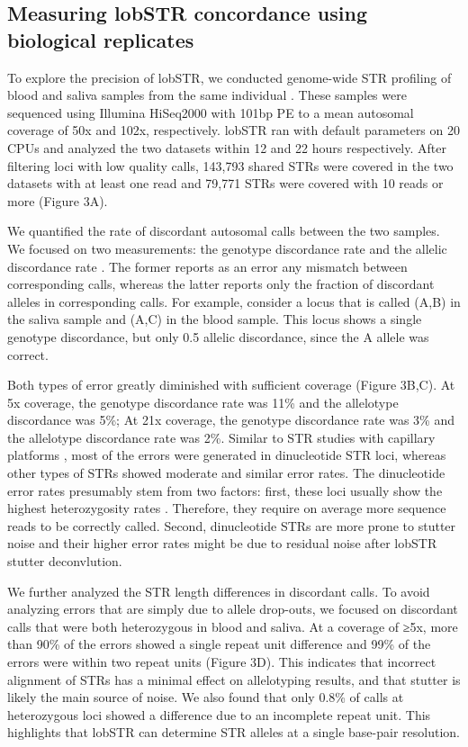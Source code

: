 \subsection{Measuring lobSTR concordance using biological replicates}
To explore the precision of lobSTR, we conducted genome-wide STR profiling of blood and saliva samples from the same individual \cite{LamClarkChenEtAl2012}. These samples were sequenced using Illumina HiSeq2000 with 101bp PE to a mean autosomal coverage of 50x and 102x, respectively. lobSTR ran with default parameters on 20 CPUs and analyzed the two datasets within 12 and 22 hours respectively. After filtering loci with low quality calls, 143,793 shared STRs were covered in the two datasets with at least one read and 79,771 STRs were covered with 10 reads or more (Figure 3A). 

We quantified the rate of discordant autosomal calls between the two samples. We focused on two measurements: the genotype discordance rate and the allelic discordance rate \cite{PompanonBoninBellemainEtAl2005}. The former reports as an error any mismatch between corresponding calls, whereas the latter reports only the fraction of discordant alleles in corresponding calls. For example, consider a locus that is called (A,B) in the saliva sample and (A,C) in the blood sample. This locus shows a single genotype discordance, but only 0.5 allelic discordance, since the A allele was correct. 

Both types of error greatly diminished with sufficient coverage (Figure 3B,C). At 5x coverage, the genotype discordance rate was 11\% and the allelotype discordance was 5\%; At 21x coverage, the genotype discordance rate was 3\% and the allelotype discordance rate was 2\%. Similar to STR studies with capillary platforms \cite{WeberBroman2001}, most of the errors were generated in dinucleotide STR loci, whereas other types of STRs showed moderate and similar error rates. The dinucleotide error rates presumably stem from two factors: first, these loci usually show the highest heterozygosity rates \cite{ChakrabortyKimmelStiversEtAl1997,BrinkmannKlintscharNeuhuberEtAl1998,PembertonSandefurJakobssonEtAl2009}. Therefore, they require on average more sequence reads to be correctly called. Second, dinucleotide STRs are more prone to stutter noise \cite{Ellegren2004} and their higher error rates might be due to residual noise after lobSTR stutter deconvlution.

We further analyzed the STR length differences in discordant calls. To avoid analyzing errors that are simply due to allele drop-outs, we focused on discordant calls that were both heterozygous in blood and saliva. At a coverage of ≥5x, more than 90\% of the errors showed a single repeat unit difference and 99\% of the errors were within two repeat units (Figure 3D). This indicates that incorrect alignment of STRs has a minimal effect on allelotyping results, and that stutter is likely the main source of noise. We also found that only 0.8\% of calls at heterozygous loci showed a difference due to an incomplete repeat unit. This highlights that lobSTR can determine STR alleles at a single base-pair resolution. 

